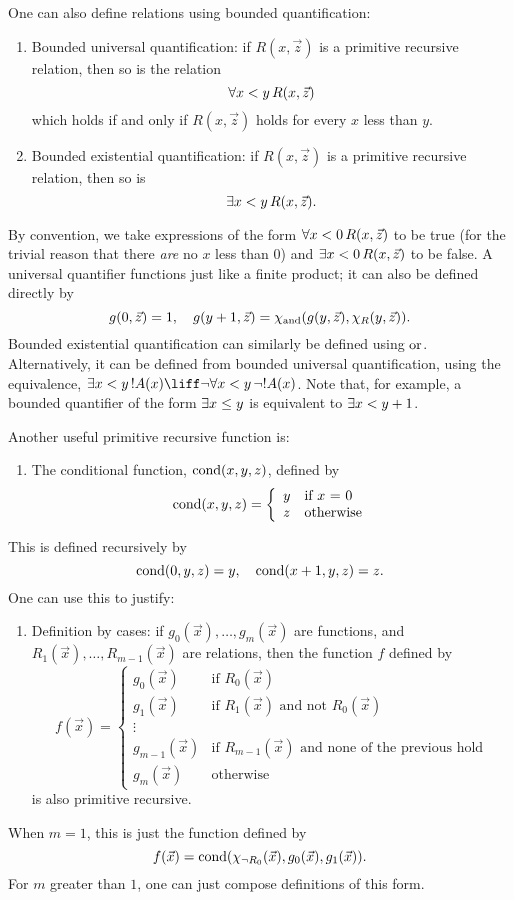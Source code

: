 \documentclass[../../include/open-logic-section]{subfiles}
\begin{document}
One can also define relations using bounded quantification:
\begin{enumerate}
\item Bounded universal quantification: if $R(x, \vec z)$ is a
primitive recursive relation, then so is the relation
\[
\lforall[x < y][R(x, \vec z)]
\]
which holds if and only if $R(x,\vec z)$ holds for every $x$ less than
$y$.
\item Bounded existential quantification: if $R(x, \vec z)$ is a
primitive recursive relation, then so is
\[
\lexists[x < y][R(x, \vec z)].
\]
\end{enumerate}
By convention, we take expressions of the form $\lforall[x < 0][R(x,\vec
z)]$ to be true (for the trivial reason that there \emph{are} no $x$
less than $0$) and $\lexists[x < 0][R(x,\vec z)]$ to be false. A universal
quantifier functions just like a finite product; it can also be
defined directly by
\[
g(0,\vec z) = 1, \quad g(y+1,\vec z) = \chi_{\mathrm{and}}(g(y,\vec
z),\chi_{R}(y,\vec z)).
\]
Bounded existential quantification can similarly be defined using
$\mathrm{or}$. Alternatively, it can be defined from bounded universal
quantification, using the equivalence, $\lexists[x < y][!A(x)] \liff \lnot
\lforall[x < y][\lnot !A(x)]$. Note that, for example, a bounded quantifier
of the form $\lexists[x \leq y]$ is equivalent to $\lexists[x < y+1]$.

Another useful primitive recursive function is:
\begin{enumerate}
\item The conditional function, $\mathrm{cond}(x,y,z)$, defined by
\[
\fn{cond}(x,y,z) = \left\{ \begin{array}{ll}
  y & \mbox{if $x$ = 0} \\
  z & \mbox{otherwise}
\end{array}\right.
\]
\end{enumerate}
This is defined recursively by
\[
\mathrm{cond}(0,y,z) = y, \quad \mathrm{cond}(x+1,y,z) = z.
\]
One can use this to justify:
\begin{enumerate}
\item Definition by cases: if $g_0(\vec x), \dots, g_m(\vec x)$ are
functions, and $R_1(\vec x), \dots, R_{m-1}(\vec x)$ are relations, then
the function $f$ defined by
\[
f(\vec x) = \left\{\begin{array}{ll}
    g_0(\vec x) & \mbox{if $R_0(\vec{x})$} \\
    g_1(\vec x) & \mbox{if $R_1(\vec{x})$ and not $R_0(\vec{x})$} \\
    \vdots & \\
    g_{m-1}(\vec x) & \mbox{if $R_{m-1}(\vec{x})$ and none of the
      previous hold}
    \\
    g_m(\vec x) & \mbox{otherwise}
\end{array}\right.
\]
is also primitive recursive.
\end{enumerate}
When $m = 1$, this is just the function defined by
\[
f(\vec x) = \mathrm{cond}(\chi_{\lnot R_0}(\vec x),g_0(\vec x),g_1(\vec
 x)).
\]
For $m$ greater than $1$, one can just compose definitions of this
form.
\end{document}
